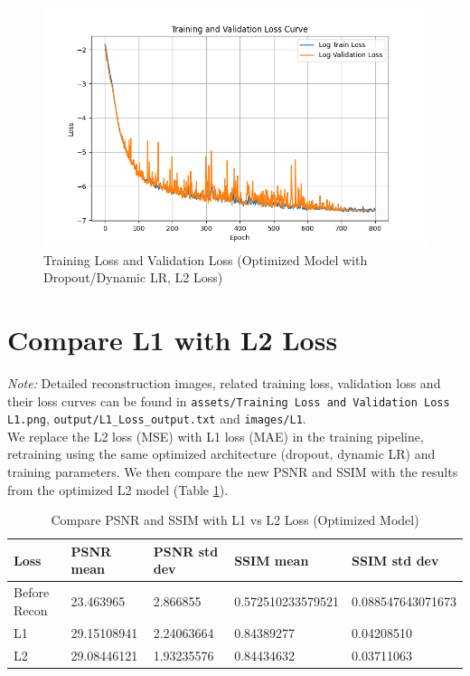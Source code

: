 \documentclass{article}
\begin{document}
\begin{figure}[H]
  \centering
  \includegraphics[width=\linewidth]{../assets/Training Loss and Validation Loss.png}
  \caption{Training Loss and Validation Loss (Optimized Model with Dropout/Dynamic LR, L2 Loss)}
  \label{fig:loss_opt}
\end{figure}



\section{Compare L1 with L2 Loss}
\textit{Note: }Detailed reconstruction images, related training loss, validation loss and their
loss curves can be found in \texttt{assets/Training Loss and Validation Loss L1.png},
\texttt{output/L1\_Loss\_output.txt} and \texttt{images/L1}.\\
We replace the L2 loss (MSE) with L1 loss (MAE) in the training pipeline, retraining using the same optimized architecture (dropout, dynamic LR) and training parameters. We then compare the new PSNR and SSIM with the results from the optimized L2 model (Table \ref{tab:loss_compare}).

\begin{table}[H]
  \caption{Compare PSNR and SSIM with L1 vs L2 Loss (Optimized Model)}
  \label{tab:loss_compare}
  \centering
  \begin{tabular}{lllll}
    \toprule
    Loss & PSNR mean   & PSNR std dev & SSIM mean  & SSIM std dev \\
    \midrule
    Before Recon    & 23.463965 & 2.866855 & 0.572510233579521 & 0.088547643071673 \\
    L1   & 29.15108941 & 2.24063664   & 0.84389277 & 0.04208510   \\
    L2   & 29.08446121 & 1.93235576   & 0.84434632 & 0.03711063   \\
    \bottomrule
  \end{tabular}
\end{table}
\end{document}
